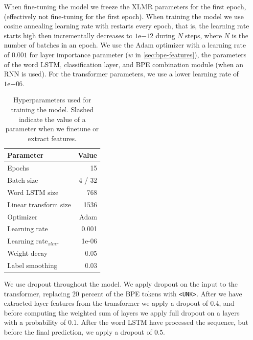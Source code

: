 \documentclass[11pt]{article}
\begin{document}
     When fine-tuning the model we freeze the XLMR parameters for the
     first epoch, (effectively not fine-tuning for the first epoch).
     When training the model we use cosine annealing learning rate
     with restarts every epoch, that is, the learning rate starts high
     then incrementally decreases to $1\mathrm{e}{-12}$ during $N$
     steps, where $N$ is the number of batches in an epoch. We use the
     Adam optimizer with a learning rate of $0.001$ for layer
     importance parameter ($w$ in \cref{sec:bpe-features}), the
     parameters of the word LSTM, classification layer, and BPE
     combination module (when an RNN is used). For the transformer
     parameters, we use a lower learning rate of $1\mathrm{e}{-06}$.

	\begin{table}%
		\centering
		\begin{tabular}{lr}
			Parameter & Value \\
			\hline
			Epochs & 15 \\
			Batch size & 4 / 32 \\
            Word LSTM size & 768 \\
            Linear transform size & 1536 \\
			Optimizer & Adam \\
			Learning rate & 0.001 \\
			Learning rate$_{xlmr}$ & 1e-06 \\
            Weight decay & 0.05 \\
			Label smoothing & 0.03 \\
		\end{tabular}
		\caption{\label{tab:parameters} Hyperparameters used for training the model. Slashed indicate the value of a parameter when we finetune or extract features.}
	\end{table}

        We use dropout throughout the model. We apply dropout on the
        input to the transformer, replacing 20 percent of the BPE tokens
        with \texttt{<UNK>}. After we have extracted layer features
        from the transformer we apply a dropout of $0.4$, and before
        computing the weighted sum of layers we apply full dropout on
        a layers with a probability of $0.1$. After the word LSTM have
        processed the sequence, but before the final prediction, we
        apply a dropout of $0.5$.
\end{document}
